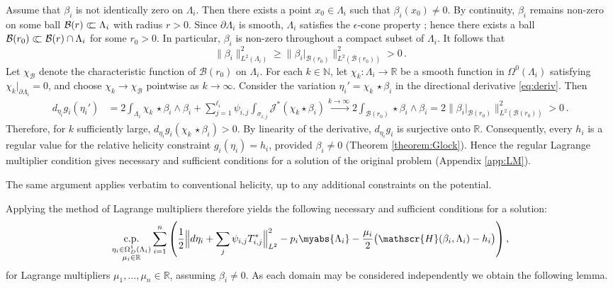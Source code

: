 \documentclass[11pt]{article}
\theoremstyle{plain}
\theoremstyle{definition}
\theoremstyle{remark}
\newcommand{\R}{\mathbb{R}}
\newcommand{\ssubset}{\subset\joinrel \! \!\subset}
\newcommand{\B}{\mathcal{B}}
\newcommand{\ST}{\Lambda}
\begin{document}
Assume that \(\beta_i\) is not identically zero on \(\ST_i\). Then there exists a point \(x_0 \in \ST_i\) such that \(\beta_i(x_0) \neq 0\). By continuity, \(\beta_i\) remains non-zero on some ball \(\B(r) \ssubset \ST_i\) with radius \(r>0\). Since \(\partial \ST_i\) is smooth, \(\ST_i\) satisfies the \(\epsilon\)-cone property \cite{henrot2018shape}; hence there exists a ball \(\B(r_0) \ssubset \B(r) \cap \ST_i\) for some \(r_0>0\). In particular, \(\beta_i\) is non-zero throughout a compact subset of \(\ST_i\). It follows that
\[
\|\beta_i\|_{L^2(\ST_i)}^2 \geq \|\beta_i|_{\B(r_0)}\|_{L^2(\B(r_0))}^2 > 0 \, .
\]
Let \(\chi_{\B}\) denote the characteristic function of \(\B(r_0)\) on \(\ST_i\). For each \(k \in \mathbb{N}\), let \(\chi_k \colon \ST_i \to \mathbb{R}\) be a smooth function in \(\Omega^0(\ST_i)\) satisfying \(\chi_k|_{\partial \ST_i}=0\), and choose \(\chi_k \to \chi_{\B}\) pointwise as \(k \to \infty\). Consider the variation \(
\eta_i' = \chi_k \,\star \beta_i \) in the directional derivative \eqref{eq:deriv}. Then
\begin{align*}
    d_{\eta_i} g_i(\eta_i')
    &= 2 \! \int_{\ST_i} \! \! \chi_k \,\star \beta_i \wedge \beta_i
       + \sum_{j=1}^{\ell_i} \psi_{i,j} \int_{\sigma_{i,j}} \! \! \mathcal{J}^*(\chi_k \star \beta_i) 
    \xrightarrow{k \to \infty}
       2 \! \int_{\B(r_0)} \! \! \star \beta_i \wedge \beta_i
       = 2\|\beta_i|_{\B(r_0)}\|_{L^2(\B(r_0))}^2
       > 0 \, .
\end{align*}
Therefore, for \(k\) sufficiently large, \(
d_{\eta_i} g_i(\chi_k \,\star \beta_i) > 0 \). By linearity of the derivative, \(d_{\eta_i} g_i\) is surjective onto \(\mathbb{R}\). Consequently, every \(h_i\) is a regular value for the relative helicity constraint \(g_i(\eta_i) = h_i\), provided \(\beta_i \neq 0\) (Theorem \ref{theorem:Glock}). Hence the regular Lagrange multiplier condition gives necessary and sufficient conditions for a solution of the original problem (Appendix \ref{app:LM}).

The same argument applies verbatim to conventional helicity, up to any additional constraints on the potential.

Applying the method of Lagrange multipliers therefore yields the following necessary and sufficient conditions for a solution:
\begin{align*}
    \underset{\substack{\eta_i \in \Omega^1_D(\ST_i) \\ \mu_i \in \R}}{\mathrm{c.p.}}
    \sum_{i=1}^n
    \left(
        \frac{1}{2}\Big\| d\eta_i + \sum_j \psi_{i,j} T_{i,j}^* \Big\|_{L^2}^2
        - p_i \myabs{\ST_i}
        - \frac{\mu_i}{2}\big(\mathscr{H}(\beta_i,\ST_i)-h_i\big)
    \right),
\end{align*}
for Lagrange multipliers \(\mu_1,\dots,\mu_n \in \R\), assuming \(\beta_i \neq 0\). As each domain may be considered independently we obtain the following lemma.
\end{document}
